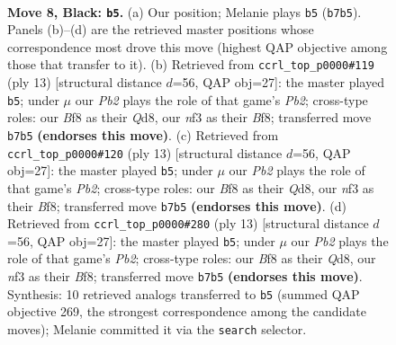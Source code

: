 \documentclass[11pt]{article}
\begin{document}
\begin{figure}[p]\centering
\begin{subfigure}{0.46\textwidth}\centering
\resizebox{\linewidth}{!}{%
\newchessgame
\chessboard[
  setfen={r1bq1b1r/pp1nkppp/2p1pn2/8/2BP4/2N1PN2/PP3PPP/R1BQ1RK1 b - - 0 8},
  showmover=false,
  pgfstyle=straightmove, color=movearrow, markmove={b7-b5}
]}
\caption{}
\end{subfigure}\hfill
\begin{subfigure}{0.46\textwidth}\centering
\resizebox{\linewidth}{!}{%
\newchessgame
\chessboard[
  setfen={r1bqkb1r/pp1n1ppp/2p1pn2/8/2BP4/2N1PN2/PP3PPP/R1BQK2R b KQkq - 0 7},
  showmover=false,
  pgfstyle=straightmove, color=movearrow, markmove={b7-b5}
]}
\caption{}
\end{subfigure}
\\[4pt]
\begin{subfigure}{0.46\textwidth}\centering
\resizebox{\linewidth}{!}{%
\newchessgame
\chessboard[
  setfen={r1bqkb1r/pp1n1ppp/2p1pn2/8/2BP4/2N1PN2/PP3PPP/R1BQK2R b KQkq - 0 7},
  showmover=false,
  pgfstyle=straightmove, color=movearrow, markmove={b7-b5}
]}
\caption{}
\end{subfigure}\hfill
\begin{subfigure}{0.46\textwidth}\centering
\resizebox{\linewidth}{!}{%
\newchessgame
\chessboard[
  setfen={r1bqkb1r/pp1n1ppp/2p1pn2/8/2BP4/2N1PN2/PP3PPP/R1BQK2R b KQkq - 0 7},
  showmover=false,
  pgfstyle=straightmove, color=movearrow, markmove={b7-b5}
]}
\caption{}
\end{subfigure}
\caption{\textbf{Move 8, Black: \texttt{b5}.} (a) Our position; Melanie plays \texttt{b5} (\texttt{b7b5}). Panels (b)--(d) are the retrieved master positions whose correspondence most drove this move (highest QAP objective among those that transfer to it). (b) Retrieved from \texttt{ccrl\_top\_p0000\#119} (ply 13) [structural distance $d$=56, QAP obj=27]: the master played \texttt{b5}; under $\mu$ our \emph{Pb2} plays the role of that game's \emph{Pb2}; cross-type roles: our \emph{B}f8 as their \emph{Q}d8, our \emph{n}f3 as their \emph{B}f8; transferred move \texttt{b7b5} \textbf{(endorses this move)}. (c) Retrieved from \texttt{ccrl\_top\_p0000\#120} (ply 13) [structural distance $d$=56, QAP obj=27]: the master played \texttt{b5}; under $\mu$ our \emph{Pb2} plays the role of that game's \emph{Pb2}; cross-type roles: our \emph{B}f8 as their \emph{Q}d8, our \emph{n}f3 as their \emph{B}f8; transferred move \texttt{b7b5} \textbf{(endorses this move)}. (d) Retrieved from \texttt{ccrl\_top\_p0000\#280} (ply 13) [structural distance $d$=56, QAP obj=27]: the master played \texttt{b5}; under $\mu$ our \emph{Pb2} plays the role of that game's \emph{Pb2}; cross-type roles: our \emph{B}f8 as their \emph{Q}d8, our \emph{n}f3 as their \emph{B}f8; transferred move \texttt{b7b5} \textbf{(endorses this move)}. Synthesis: 10 retrieved analogs transferred to \texttt{b5} (summed QAP objective 269, the strongest correspondence among the candidate moves); Melanie committed it via the \texttt{search} selector.}
\label{fig:thought-m15}
\end{figure}
\end{document}
